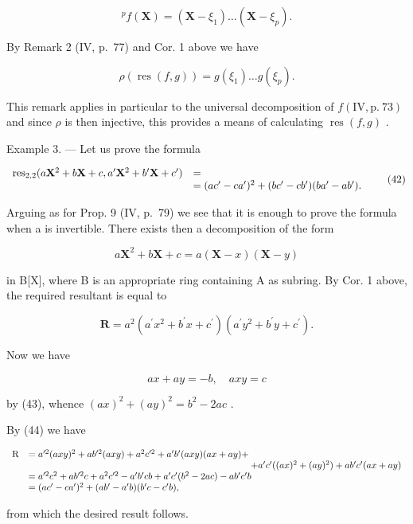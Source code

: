 \[
{ } ^ { p } f ( \mathbf { X } ) = ( \mathbf { X } - \xi _ { 1 } ) \dots ( \mathbf { X } - \xi _ { p } ) .
\]

By Remark 2 (IV, p.~77) and Cor. 1 above we have

\[
\rho (\operatorname{res} (f, g)) = g (\xi_ {1}) \dots g (\xi_ {p}).
\]

This remark applies in particular to the universal decomposition of \(f(\mathrm{IV}, \mathrm{p.~73})\) and since \(\rho\) is then injective, this provides a means of calculating \(\operatorname{res}(f, g)\) .

Example 3. --- Let us prove the formula

\[
\begin{array}{r l} \operatorname{res} _ {2, 2} (a \mathbf {X} ^ {2} + b \mathbf {X} + c, a ^ {\prime} \mathbf {X} ^ {2} + b ^ {\prime} \mathbf {X} + c ^ {\prime}) & = \\ & = (a c ^ {\prime} - c a ^ {\prime}) ^ {2} + (b c ^ {\prime} - c b ^ {\prime}) (b a ^ {\prime} - a b ^ {\prime}). \end{array}\tag{42}
\]

Arguing as for Prop. 9 (IV, p.~79) we see that it is enough to prove the formula when a is invertible. There exists then a decomposition of the form

\[
a \mathbf {X} ^ {2} + b \mathbf {X} + c = a (\mathbf {X} - x) (\mathbf {X} - y)\tag{43}
\]

in B{[}X{]}, where B is an appropriate ring containing A as subring. By Cor. 1 above, the required resultant is equal to

\[
\mathbf {R} = a ^ {2} \left(a ^ {\prime} x ^ {2} + b ^ {\prime} x + c ^ {\prime}\right) \left(a ^ {\prime} y ^ {2} + b ^ {\prime} y + c ^ {\prime}\right).\tag{44}
\]

Now we have

\[
a x + a y = - b, \quad a x y = c
\]

by (43), whence \((ax)^2 + (ay)^2 = b^2 - 2ac\) .

By (44) we have

\[
\begin{array}{r l} \mathrm{R} & = a ^ {\prime 2} (a x y) ^ {2} + a b ^ {\prime 2} (a x y) + a ^ {2} c ^ {\prime 2} + a ^ {\prime} b ^ {\prime} (a x y) (a x + a y) + \\ & \qquad \qquad \qquad \qquad \qquad \qquad \qquad \qquad \qquad \qquad \qquad \qquad + a ^ {\prime} c ^ {\prime} ((a x) ^ {2} + (a y) ^ {2}) + a b ^ {\prime} c ^ {\prime} (a x + a y) \\ & = a ^ {\prime 2} c ^ {2} + a b ^ {\prime 2} c + a ^ {2} c ^ {\prime 2} - a ^ {\prime} b ^ {\prime} c b + a ^ {\prime} c ^ {\prime} (b ^ {2} - 2 a c) - a b ^ {\prime} c ^ {\prime} b \\ & = (a c ^ {\prime} - c a ^ {\prime}) ^ {2} + (a b ^ {\prime} - a ^ {\prime} b) (b ^ {\prime} c - c ^ {\prime} b), \end{array}
\]

from which the desired result follows.

